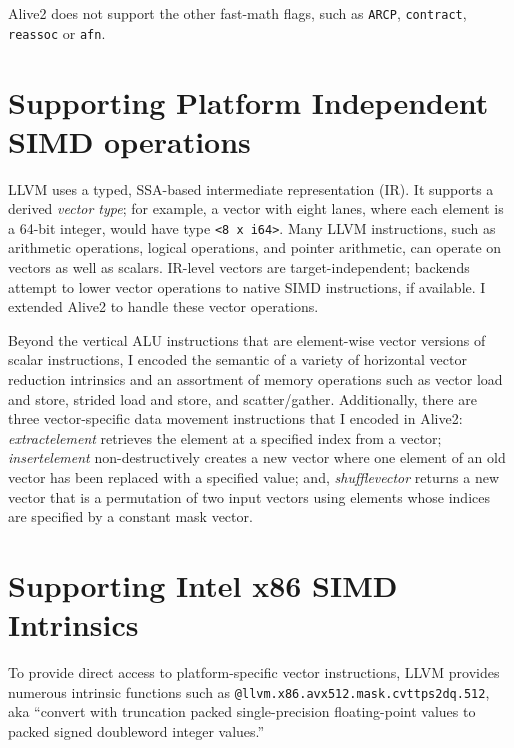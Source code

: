 Alive2 does not support the other fast-math flags, such as \texttt{ARCP},
\texttt{contract}, \texttt{reassoc} or \texttt{afn}.

\section{Supporting Platform Independent SIMD operations}

LLVM uses a typed, SSA-based intermediate representation (IR).
%
It supports a derived \emph{vector type}; for example, a vector with
eight lanes, where each element is a 64-bit integer, would have type
\texttt{<8 x i64>}.
%
Many LLVM instructions, such as arithmetic operations, logical operations,
and pointer arithmetic, can operate on vectors as well as scalars.
%
IR-level vectors are target-independent; backends attempt to lower
vector operations to native SIMD instructions, if available.
I extended Alive2 to handle these vector operations.


Beyond the vertical ALU instructions that are element-wise vector
versions of scalar instructions, I encoded the semantic of a
variety of horizontal vector reduction intrinsics and an assortment of
memory operations such as vector load and store, strided load and
store, and scatter/gather.
%
Additionally, there are three vector-specific data movement
instructions that I encoded in Alive2:
%
\textit{extractelement} retrieves the element at a specified index
from a vector;
%
\textit{insertelement} non-destructively creates a new vector where
one element of an old vector has been replaced with a specified value;
%
and, \textit{shufflevector} returns a new vector that is a permutation
of two input vectors using elements whose indices are specified by a
constant mask vector.


\section{Supporting Intel x86 SIMD Intrinsics}

To provide direct access to platform-specific vector
instructions, LLVM provides numerous intrinsic functions such as
\texttt{@llvm.x86.avx512.mask.cvttps2dq.512}, aka ``convert with
truncation packed single-precision floating-point values to packed
signed doubleword integer values.''

